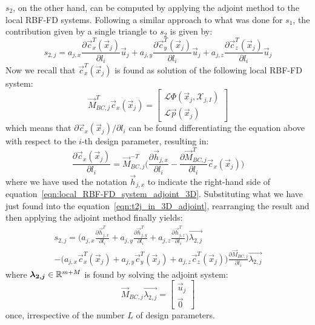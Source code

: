 $s_2$, on the other hand, can be computed by applying the adjoint method to the local RBF-FD systems. Following a similar approach to what was done for $s_1$, the contribution given by a single triangle to $s_2$ is given by:
\begin{equation}
	\label{eqn:t2j_in_3D_adjoint}
	s_{2,j} = a_{j,x}\frac{\partial \vec{c}_x^T(\vec{x}_j)}{\partial l_i}\vec{u}_j + a_{j,y}\frac{\partial \vec{c}_y^T(\vec{x}_j)}{\partial l_i}\vec{u}_j + a_{j,z}\frac{\partial \vec{c}_z^T(\vec{x}_j)}{\partial l_i}\vec{u}_j
\end{equation}
Now we recall that $\vec{c}_x^T(\vec{x}_j)$ is found as solution of the following local RBF-FD system:
\begin{equation}
	\label{eqn:local_RBF-FD_system_adjoint_3D}
	\vec{M}_{BC,j}^T \vec{c}_x(\vec{x}_j) =
	\begin{bmatrix}
		\mathcal{L} \Phi(\vec{x}_j, \mathcal{X}_{j,I})  \\
		\mathcal{L} \vec{p}(\vec{x}_j)
	\end{bmatrix}
\end{equation}
which means that $\partial \vec{c}_x(\vec{x}_j) / \partial l_i$ can be found differentiating the equation above with respect to the $i$-th design parameter, resulting in:
\begin{equation}
	\label{eqn:local_RBF-FD_system_differentited}
	\frac{\partial \vec{c}_x(\vec{x}_j)}{\partial l_i} = \vec{M}_{BC,j}^{-T} \biggl( \frac{\partial \vec{h}_{j,x}}{\partial l_i} - \frac{\partial \vec{M}_{BC,j}^T}{\partial l_i}\vec{c}_x(\vec{x}_j) \biggr)
\end{equation}
where we have used the notation $\vec{h}_{j,x}$ to indicate the right-hand side of equation~\eqref{eqn:local_RBF-FD_system_adjoint_3D}.
Substituting what we have just found into the equation~\eqref{eqn:t2j_in_3D_adjoint}, rearranging the result and then applying the adjoint method finally yields:
\begin{multline}
	s_{2,j} = \biggl( a_{j,x} \frac{\partial \vec{h}_{j,x}^T}{\partial l_i} + a_{j,y} \frac{\partial \vec{h}_{j,y}^T}{\partial l_i} + a_{j,z} \frac{\partial \vec{h}_{j,z}^T}{\partial l_i} \biggr) \vec{\lambda_{2,j}}  \\
	 - \biggl( a_{j,x}\vec{c}_x^T(\vec{x}_j) + a_{j,y}\vec{c}_y^T(\vec{x}_j) + a_{j,z}\vec{c}_z^T(\vec{x}_j) \biggr) \frac{\partial \vec{M}_{BC,j}}{\partial l_i} \vec{\lambda_{2,j}}
\end{multline}
where $\boldsymbol{\lambda_{2,j}} \in \mathbb{R}^{m+M}$ is found by solving the adjoint system:
\begin{equation}
	\label{eqn:adjoint_system_t2j}
	\vec{M}_{BC,j} \vec{\lambda_{2,j}} =
	\begin{bmatrix}
		\vec{u}_j  \\
		\vec{0}
	\end{bmatrix}
\end{equation}
once, irrespective of the number $L$ of design parameters.

